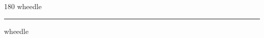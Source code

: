 
\begin{frame}
\begin{center}
\begin{turn}{180}
{\fontsize{2.5cm}{1em}\selectfont wheedle}
\end{turn}
\vspace{1em}\par  
\hrule
\vspace{1em}\par  
{\fontsize{2.5cm}{1em}\selectfont wheedle}
\end{center}
\end{frame}
